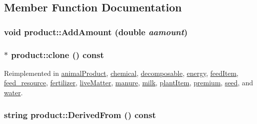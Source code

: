 \subsection{Member Function Documentation}
\hypertarget{classproduct_a26b6891b511237f0a054b3996a4c51bf}{
\subsubsection[{AddAmount}]{\setlength{\rightskip}{0pt plus 5cm}void product::AddAmount (double {\em aamount})}}
\label{classproduct_a26b6891b511237f0a054b3996a4c51bf}
\hypertarget{classproduct_a18a1df87f3400774db21d1e8c573f04a}{
\subsubsection[{clone}]{ $\ast$ product::clone () const}}
\label{classproduct_a18a1df87f3400774db21d1e8c573f04a}


Reimplemented in \hyperlink{classanimal_product_a46df4e113bcf6d492c31250569966806}{animalProduct}, \hyperlink{classchemical_aee0689e71b3bfe7f7dbd91009b707fd5}{chemical}, \hyperlink{classdecomposable_ab15f1f4e93e58810887029648be0ec31}{decomposable}, \hyperlink{classenergy_a42dce7e281e54a333e65e3ca826c90ac}{energy}, \hyperlink{classfeed_item_a7e3003ebb344d52fea31448657666253}{feedItem}, \hyperlink{classfeed__resource_ab5b47b60feeca736e185b15a5125836a}{feed\_\-resource}, \hyperlink{classfertilizer_aef152b18be864a2df64fd26fbed575e5}{fertilizer}, \hyperlink{classlive_matter_a08101ef64ee3eeec55d222bb75975370}{liveMatter}, \hyperlink{classmanure_af2915d37963e5f4d3a4b0c0d91fab188}{manure}, \hyperlink{classmilk_a185c7b47cef30f2993c339ca48af7db5}{milk}, \hyperlink{classplant_item_ae9aec44d433339eca078b4277801717a}{plantItem}, \hyperlink{classpremium_aa8167e20347089e9037fcba95f4fe435}{premium}, \hyperlink{classseed_a0e2e68f7724e0551b885433a1e935ebf}{seed}, and \hyperlink{classwater_ad3802425a88e7734530ac3d13feac437}{water}.\hypertarget{classproduct_a57ad202aca39d005745e104f91349908}{
\subsubsection[{DerivedFrom}]{\setlength{\rightskip}{0pt plus 5cm}string product::DerivedFrom () const}}
\label{classproduct_a57ad202aca39d005745e104f91349908}


